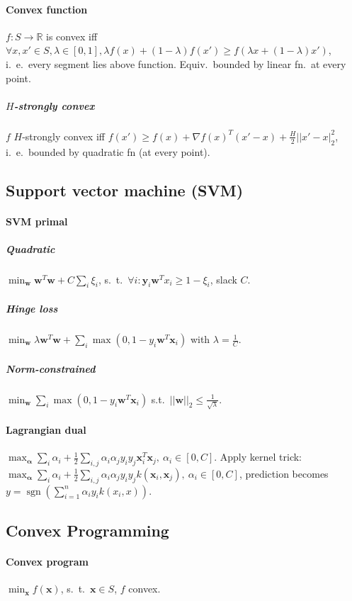 \documentclass[9pt]{scrartcl}
\DeclareMathOperator{\sign}{sgn}
\newcommand{\R}{\mathbb{R}}
\begin{document}
\begin{twocolumn}
\paragraph{Convex function} $f: S \rightarrow \R$ is convex iff $\forall x,x'\in S, \lambda \in [0,1], \lambda f(x) + (1-\lambda)f(x') \geq f(\lambda x + (1-\lambda)x')$, i.\ e.\ every segment lies above function. Equiv.\ bounded by linear fn.\ at every point.
\subparagraph{$H$-strongly convex} $f$ $H$-strongly convex iff $f(x') \geq f(x) + \nabla f(x)^T(x'-x)+\frac{H}{2}||x'-x|_2^2$, i.\ e.\ bounded by quadratic fn (at every point).
\subsection{Support vector machine (SVM)}
\paragraph{SVM primal}
\subparagraph{Quadratic} $\min_{\bm w} \bm w^T \bm w + C\sum_{i}\xi_i$,
s.\ t.\ $\forall i: \bm y_i\bm w^T x_i \geq 1 - \xi_i$, slack $C$.
\subparagraph{Hinge loss}
$\min_{\bm w} \lambda \bm w^T \bm w + \sum_{i}\max(0,1-y_i\bm w^T \bm x_i)$ with $\lambda = \frac{1}{C}$.
\subparagraph{Norm-constrained}
$\min_{\bm w} \sum_{i}\max(0,1-y_i\bm w^T\bm x_i)$ s.t.\ $||\bm w||_2 \leq \frac{1}{\sqrt \lambda}$.
\paragraph{Lagrangian dual}
$\max_{\bm \alpha} \sum_{i}\alpha_i + \frac{1}{2}\sum_{i,j}\alpha_i\alpha_j y_i y_j \bm x_i^T\bm x_j,\ \alpha_i \in [0,C]$.
Apply kernel trick: 
$\max_{\bm \alpha} \sum_{i}\alpha_i + \frac{1}{2}\sum_{i,j}\alpha_i\alpha_j y_i y_j k(\bm x_i, \bm x_j),\ \alpha_i \in [0,C]$, prediction becomes $y = \sign(\sum_{i=1}^{n}\alpha_i y_i k(x_i,x))$.

\subsection{Convex Programming}
\paragraph{Convex program} $\min_{\bm x} f(\bm x)$, s.\ t.\ $\bm x \in S$, $f$ convex.

\end{twocolumn}
\end{document}
